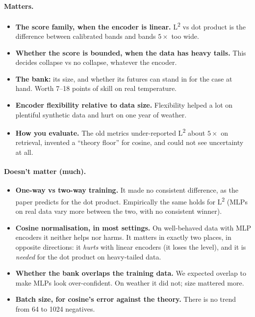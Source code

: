 \documentclass[11pt]{article}
\newcommand{\Ltwo}{L\textsuperscript{2}}
\begin{document}
\paragraph{Matters.}
\begin{itemize}
\item \textbf{The score family, when the encoder is linear.} \Ltwo{} vs dot product is the
  difference between calibrated bands and bands $5\times$ too wide.
\item \textbf{Whether the score is bounded, when the data has heavy tails.} This decides
  collapse vs no collapse, whatever the encoder.
\item \textbf{The bank:} its size, and whether its futures can stand in for the case at
  hand. Worth 7--18 points of skill on real temperature.
\item \textbf{Encoder flexibility relative to data size.} Flexibility helped a lot on
  plentiful synthetic data and hurt on one year of weather.
\item \textbf{How you evaluate.} The old metrics under-reported \Ltwo{} about $5\times$ on
  retrieval, invented a ``theory floor'' for cosine, and could not see uncertainty at all.
\end{itemize}

\paragraph{Doesn't matter (much).}
\begin{itemize}
\item \textbf{One-way vs two-way training.} It made no consistent difference, as the paper
  predicts for the dot product. Empirically the same holds for \Ltwo{} (MLPs on real data
  vary more between the two, with no consistent winner).
\item \textbf{Cosine normalisation, in most settings.} On well-behaved data with MLP
  encoders it neither helps nor harms. It matters in exactly two places, in opposite
  directions: it \emph{hurts} with linear encoders (it loses the level), and it is
  \emph{needed} for the dot product on heavy-tailed data.
\item \textbf{Whether the bank overlaps the training data.} We expected overlap to make MLPs
  look over-confident. On weather it did not; size mattered more.
\item \textbf{Batch size, for cosine's error against the theory.} There is no trend from 64
  to 1024 negatives.
\end{itemize}
\end{document}

